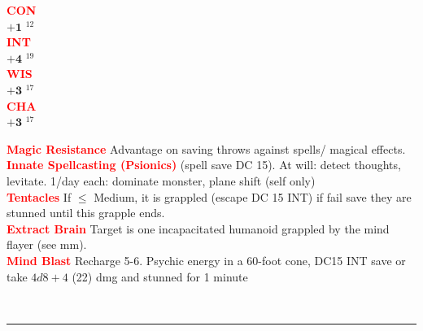 \documentclass{article}
\begin{document}
\begin{adjustbox}{minipage=0.45\textwidth, margin=\fboxsep, bgimage=../images/texture2.pdf}
{\begin{minipage}[t][10.5in][t]{0.9\textwidth}
\begin{minipage}[t]{0.2\textwidth}
{            \textcolor{red}{\textbf{CON}}\\[0.1em]
            $\mathbf{+1}$\,\,$^{12}$ \\[0.1em]
            \textcolor{red}{\textbf{INT}}\\[0.1em]
            $\mathbf{+4}$\,\,$^{19}$ \\[0.1em]
            \textcolor{red}{\textbf{WIS}}\\[0.1em]
            $\mathbf{+3}$\,\,$^{17}$ \\[0.1em]
            \textcolor{red}{\textbf{CHA}}\\[0.1em]
            $\mathbf{+3}$\,\,$^{17}$ \\[0.1em]
            }
        \end{minipage}
        \hspace{-0.1in}
        \vline
        \hspace{0.1in}
        \begin{minipage}[t]{0.7\textwidth}
            \textcolor{red}{\textbf{Magic Resistance}} Advantage on saving throws against spells/ magical effects. \\[0.2em]
            \textcolor{red}{\textbf{Innate Spellcasting (Psionics)}} (spell save DC 15). At will: detect thoughts, levitate. 1/day each: dominate monster, plane shift (self only) \\[0.2em]
            \textcolor{red}{\textbf{Tentacles}}  If $\leq$  Medium, it is grappled (escape DC 15 INT) if fail save they are stunned until this grapple ends. \\[0.2em]
            \textcolor{red}{\textbf{Extract Brain}} Target is one incapacitated humanoid grappled by the mind flayer (see mm). \\[0.2em]
            \textcolor{red}{\textbf{Mind Blast}} Recharge 5-6. Psychic energy in a 60-foot cone, DC15 INT save or take $4d8 + 4$ (22) dmg and stunned for 1 minute\\
        \end{minipage}
        \vspace{0.025in}\\
        \rule{\textwidth}{1pt}\\

\end{minipage}}
\end{adjustbox}
\end{document}
